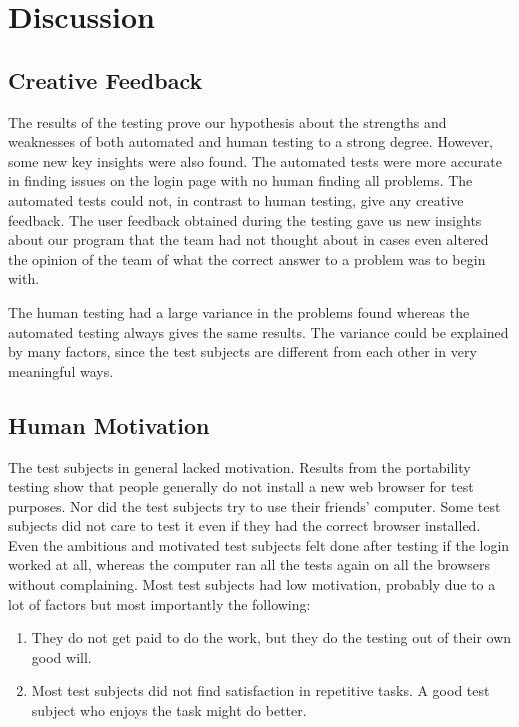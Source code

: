 \documentclass[journal,twocolumn]{IEEEtran}
\begin{document}
\section{Discussion}
\subsection{Creative Feedback}
The results of the testing prove our hypothesis about the strengths and weaknesses of both automated and human testing to a strong degree. However, some new key insights were also found. The automated tests were more accurate in finding issues on the login page with no human finding all problems. The automated tests could not, in contrast to human testing, give any creative feedback. The user feedback obtained during the testing gave us new insights about our program that the team had not thought about in cases even altered the opinion of the team of what the correct answer to a problem was to begin with.

The human testing had a large variance in the problems found whereas the automated testing always gives the same results. The variance could be explained by many factors, since the test subjects are different from each other in very meaningful ways.

\subsection{Human Motivation}
The test subjects in general lacked motivation. Results from the portability testing show that people generally do not install a new web browser for test purposes. Nor did the test subjects try to use their friends' computer. Some test subjects did not care to test it even if they had the correct browser installed. Even the ambitious and motivated test subjects felt done after testing if the login worked at all, whereas the computer ran all the tests again on all the browsers without complaining. Most test subjects had low motivation, probably due to a lot of factors but most importantly the following:

\begin{enumerate}
    \item They do not get paid to do the work, but they do the testing out of their own good will.
    \item Most test subjects did not find satisfaction in repetitive tasks. A good test subject who enjoys the task might do better.
\end{enumerate}
\end{document}
